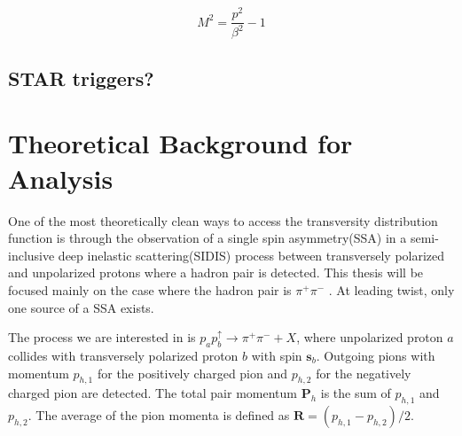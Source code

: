 \documentclass[abstract = on,listof=totoc, bibliography=totoc]{scrreprt}
\newcommand{\pip}{\pi^+}
\newcommand{\pim}{\pi^-}
\newcommand{\pair}{$\pip\pim$ }
\begin{document}
\begin{equation}
\label{eq:mtof}
M^2 = \frac{p^2}{\beta^2} - 1
\end{equation}


\section{STAR triggers?}

\chapter{Theoretical Background for Analysis}
\label{ch:theory}

One of the most theoretically clean ways to access the transversity distribution function is through the observation of a single spin asymmetry(SSA) in a semi-inclusive deep inelastic scattering(SIDIS) process between transversely polarized and unpolarized protons where a hadron pair is detected\cite{bacchettaRadici2}. This thesis will be focused mainly on the case where the hadron pair is \pair. At leading twist, only one source of a SSA exists\cite{bacchettaRadici2}. 

The process we are interested in is $p_ap_b^\uparrow \rightarrow \pi^+\pi^- + X$, where unpolarized proton $a$ collides with transversely polarized proton $b$ with spin $\boldsymbol{s}_b$. Outgoing pions with momentum $p_{h,1}$ for the positively charged pion and $p_{h,2}$ for the negatively charged pion are detected. The total pair momentum $\bm{P}_h$ is the sum of $p_{h,1}$ and $p_{h,2}$. The average of the pion momenta is defined as $\bm{R}= (p_{h,1}-p_{h,2})/2$.
\end{document}
